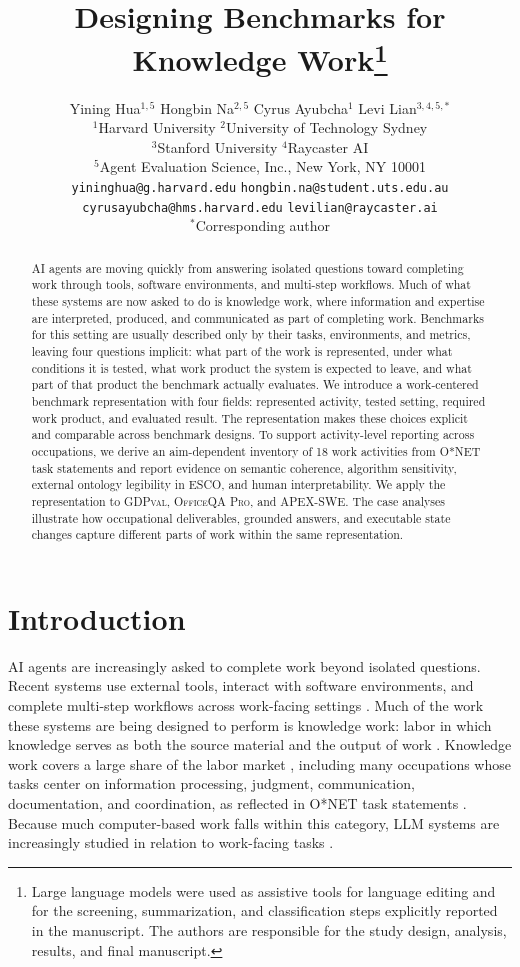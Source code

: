 \documentclass[10pt]{article}
\title{Designing Benchmarks for Knowledge Work\thanks{Large language models were used as assistive tools for language editing and for the screening, summarization, and classification steps explicitly reported in the manuscript. The authors are responsible for the study design, analysis, results, and final manuscript.}}
\author{%
Yining Hua$^{1,5}$ \quad Hongbin Na$^{2,5}$ \quad Cyrus Ayubcha$^{1}$ \quad Levi Lian$^{3,4,5,*}$\\
\normalfont\small $^{1}$Harvard University \quad $^{2}$University of Technology Sydney\\
\normalfont\small $^{3}$Stanford University \quad $^{4}$Raycaster AI\\
\normalfont\small $^{5}$Agent Evaluation Science, Inc., New York, NY 10001\\
\normalfont\small \texttt{yininghua@g.harvard.edu} \quad \texttt{hongbin.na@student.uts.edu.au}\\
\normalfont\small \texttt{cyrusayubcha@hms.harvard.edu} \quad \texttt{levilian@raycaster.ai}\\
\normalfont\small $^{*}$Corresponding author
}
\begin{document}
\maketitle

\begin{abstract}
AI agents are moving quickly from answering isolated questions toward completing work through tools, software environments, and multi-step workflows. Much of what these systems are now asked to do is knowledge work, where information and expertise are interpreted, produced, and communicated as part of completing work. Benchmarks for this setting are usually described only by their tasks, environments, and metrics, leaving four questions implicit: what part of the work is represented, under what conditions it is tested, what work product the system is expected to leave, and what part of that product the benchmark actually evaluates. We introduce a work-centered benchmark representation with four fields: represented activity, tested setting, required work product, and evaluated result. The representation makes these choices explicit and comparable across benchmark designs. To support activity-level reporting across occupations, we derive an aim-dependent inventory of 18 work activities from O{*}NET task statements and report evidence on semantic coherence, algorithm sensitivity, external ontology legibility in ESCO, and human interpretability. We apply the representation to \textsc{GDPval}, \textsc{OfficeQA Pro}, and \textsc{APEX-SWE}. The case analyses illustrate how occupational deliverables, grounded answers, and executable state changes capture different parts of work within the same representation.
\end{abstract}

\section{Introduction}

AI agents are increasingly asked to complete work beyond isolated questions. Recent systems use external tools, interact with software environments, and complete multi-step workflows across work-facing settings \citep{wang2024survey}.
Much of the work these systems are being designed to perform is knowledge work: labor in which knowledge serves as both the source material and the output of work \citep{drucker1999productivity,davenport2005thinking}.
Knowledge work covers a large share of the labor market \citep{porat1977information}, including many occupations whose tasks center on information processing, judgment, communication, documentation, and coordination, as reflected in O{*}NET task statements \citep{onet2024tasks}.
Because much computer-based work falls within this category, LLM systems are increasingly studied in relation to work-facing tasks \citep{eloundou2023gpts,brynjolfsson2023genai}.
\end{document}
